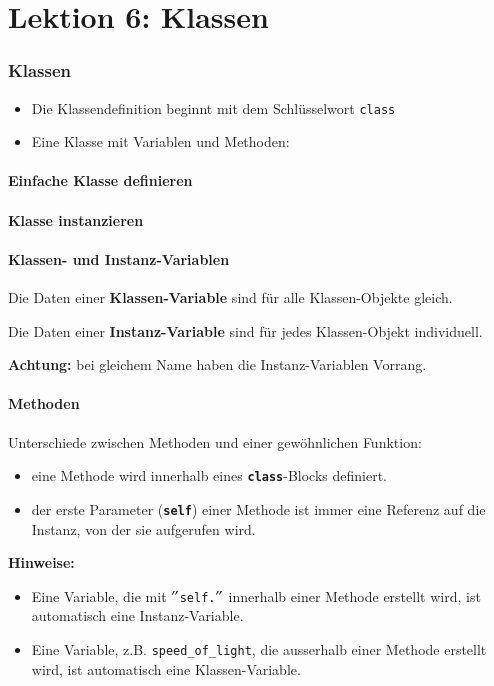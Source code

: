 \part*{Lektion 6: Klassen}
\section{Klassen}
\begin{itemize}
	\item Die Klassendefinition beginnt mit dem Schlüsselwort \texttt{class}
\end{itemize}

\begin{itemize}
	\item Eine Klasse mit Variablen und Methoden:
\end{itemize}


\subsection{Einfache Klasse definieren}


\subsection{Klasse instanzieren}


\subsection{Klassen- und Instanz-Variablen}

Die Daten einer \textbf{Klassen-Variable} sind für alle Klassen-Objekte gleich.

Die Daten einer \textbf{Instanz-Variable} sind für jedes Klassen-Objekt individuell.

\textbf{Achtung:} bei gleichem Name haben die Instanz-Variablen Vorrang.


\subsection{Methoden}

Unterschiede zwischen Methoden und einer gewöhnlichen Funktion:
\begin{itemize}
	\item eine Methode wird innerhalb eines \textbf{\texttt{class}}-Blocks definiert.
	\item der erste Parameter (\textbf{\texttt{self}}) einer Methode ist immer eine Referenz auf die Instanz, von der sie aufgerufen wird.
\end{itemize}
\textbf{Hinweise:}
\begin{itemize}
	\item Eine Variable, die mit $"$\texttt{self.}$"$ innerhalb einer Methode erstellt wird, ist automatisch eine Instanz-Variable.
	\item Eine Variable, z.B. \texttt{speed\_of\_light}, die ausserhalb einer Methode erstellt wird, ist automatisch eine Klassen-Variable.
\end{itemize}

